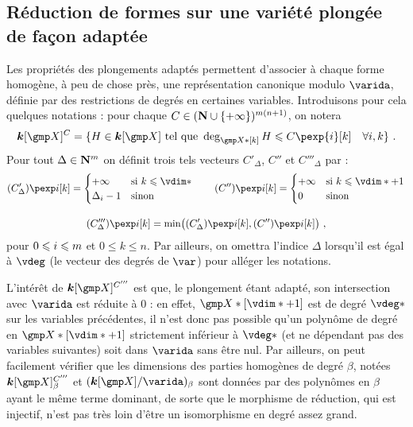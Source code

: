 
\subsection{Réduction de formes sur une variété plongée de façon adaptée}
\label{sec:rfull}

Les propriétés des plongements adaptés permettent d'associer à chaque forme
homogène, à peu de chose près, une représentation canonique modulo \( \varida
\), définie par des restrictions de degrés en certaines variables.
Introduisons pour cela quelques notations : pour chaque \( C \in ({\mathbf{N}} \cup
  \lbrace +\infty \rbrace) ^{m(n+1)} \), on notera
\begin{equation} \label{e:C-spaces}
  \cdn[\vmp]^C
  = \{
    H \in \cdn[\vmp]
    \text{ tel que }
    \deg_{\vmp*[k]} H \le C\pexp{\fct}[k]
    \quad \forall i, k
    \}
  \pmm.
\end{equation}
Pour tout \( \Delta \in {\mathbf{N}}^m \) on définit trois tels vecteurs \(
  C'_\Delta \), \( C'' \) et \( C'''_\Delta \) par :
\begin{gather} \label{e:C-i-iii}
  (C'_\Delta)\pexp\fct[\ind] =
  \begin{cases}
    +\infty & \text{si \( \ind \le \vdim* \)} \\
    \Delta_\fct - 1 & \text{sinon}
  \end{cases}
  \qquad
  (C'')\pexp\fct[\ind] =
  \begin{cases}
    +\infty & \text{si \( \ind \le \vdim* + 1 \)} \\
    0 & \text{sinon}
  \end{cases}
  \\[1em]
  (C'''_\Delta)\pexp\fct[\ind] = \min\bigl(
    (C'_\Delta)\pexp\fct[\ind], (C'')\pexp\fct[\ind]
  \bigr)
  \pmm,
\end{gather}
pour \( 0 \leqslant i \leqslant m \) et \( 0 \le k \le n \).  Par ailleurs, on
omettra l'indice \( \Delta \) lorsqu'il est égal à \( \vdeg \) (le vecteur des
degrés de \( \var \)) pour alléger les notations.

L'intérêt de \( \cdn[ \vmp ]^{C'''} \) est que, le plongement étant
adapté, son intersection avec \( \varida \) est réduite à \( 0 \) : en effet,
\( \vmp*[\vdim*+1] \) est de degré \( \vdeg* \) sur les variables précédentes,
il n'est donc pas possible qu'un polynôme de degré en \( \vmp*[\vdim*+1] \)
strictement inférieur à \( \vdeg* \) (et ne dépendant pas des variables
suivantes) soit dans \( \varida \) sans être nul.
Par ailleurs, on peut facilement vérifier que les dimensions des parties
homogènes de degré \( \beta \), notées \( \cdn[ \vmp ]^{C'''}_{\beta} \) et \(
  ( \cdn[\vmp] / \varida)_\beta \) sont données par des polynômes en \( \beta
\) ayant le même terme dominant, de sorte que le morphisme de réduction, qui
est injectif, n'est pas très loin d'être un isomorphisme en degré assez grand.

